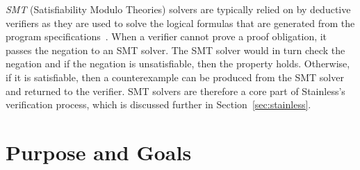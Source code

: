 \documentclass[11pt,titlepage,openright]{book}
\newcommand{\Footnote}[2][0mm]{\footnotemark\marginnote{\footnotesize$^{\arabic{footnote})}$~#2}[#1]}
\newcommand{\RED}[1]{\textcolor{red}{#1}}
\begin{document}
\emph{SMT} (Satisfiability Modulo Theories) solvers are typically
relied on by deductive verifiers as they are used to 
solve the logical formulas that are generated from the 
program specifications~\cite{SMTSolvers}. 
When a verifier cannot prove a proof obligation, it passes the
negation to an SMT solver. The SMT solver would in turn
check the negation and if the negation is unsatisfiable, then the property
holds. Otherwise, if it is satisfiable, then a counterexample
can be produced from the SMT solver and returned to 
the verifier. SMT solvers are therefore a core part of 
Stainless's verification process, which is discussed further
in Section~\ref{sec:stainless}.


%





\section{Purpose and Goals}
\label{sec:purpose-goals}
\end{document}
